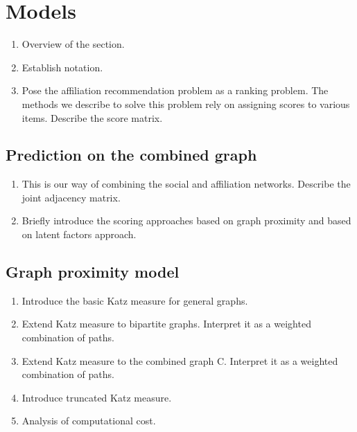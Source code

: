 \documentclass[11pt]{article}
\begin{document}
\section{Models}
\begin{enumerate}
 \item Overview of the section.
 \item Establish notation.
 \item Pose the affiliation recommendation problem as a ranking problem. The methods we describe to solve this problem rely on assigning scores to various items. Describe the score matrix.
\end{enumerate}

\subsection{Prediction on the combined graph}
\begin{enumerate}
 \item This is our way of combining the social and affiliation networks. Describe the joint adjacency matrix.
 \item Briefly introduce the scoring approaches based on graph proximity and based on latent factors approach.
\end{enumerate}

\subsection{Graph proximity model}
\begin{enumerate}
 \item Introduce the basic Katz measure for general graphs.
 \item Extend Katz measure to bipartite graphs. Interpret it as a weighted combination of paths.
 \item Extend Katz measure to the combined graph C. Interpret it as a weighted combination of paths.
 \item Introduce truncated Katz measure.
 \item Analysis of computational cost.
\end{enumerate}
\end{document}
